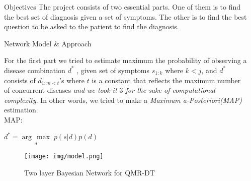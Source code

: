 \documentclass[final]{beamer}
\newlength{\sepwid}
\newlength{\onecolwid}
\newcommand{\argmax}[1]{\underset{#1}{\operatorname{arg}\,\operatorname{max}}\;}
\begin{document}
\begin{frame}
\begin{columns}[t]
\begin{column}{\sepwid}\end{column} %

\begin{column}{\onecolwid} %


\begin{exampleblock}{Objectives}
 The project consists of two essential parts. One of them is to find the best set of diagnosis given a set of symptoms. The other is to find the best question to be asked to the patient to find the diagnosis.

\end{exampleblock}



\begin{exampleblock}{Network Model \& Approach}

For the first part we tried to estimate maximum the probability of observing a disease combination  $d^*$ , given set of symptoms $s_{1:k}$ where $k<j$, and $d^*$ consists of $d_{1:m<t}$'s where $t$ is a constant that reflects the maximum number of concurrent diseases \textit{and we took it $3$ for the sake of computational complexity}. In other words, we tried to make a \textit{Maximum a-Posteriori(MAP)} estimation. \\
MAP: 
\begin{center}
$d^* = \argmax{d} p(s|d)p(d)$
\end{center}


 \begin{figure}
\texttt{[image: img/model.png]}
\caption{Two layer Bayesian Network for QMR-DT}
\end{figure}


\end{exampleblock}







\end{column}
\end{columns}
\end{frame}
\end{document}
